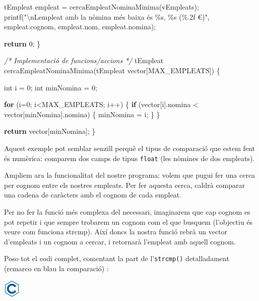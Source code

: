 \documentclass[]{book}
\newenvironment{Shaded}{\begin{snugshade}}{\end{snugshade}}
\newcommand{\CommentTok}[1]{\textcolor[rgb]{0.56,0.35,0.01}{\textit{#1}}}
\newcommand{\ControlFlowTok}[1]{\textcolor[rgb]{0.13,0.29,0.53}{\textbf{#1}}}
\newcommand{\DataTypeTok}[1]{\textcolor[rgb]{0.13,0.29,0.53}{#1}}
\newcommand{\DecValTok}[1]{\textcolor[rgb]{0.00,0.00,0.81}{#1}}
\newcommand{\NormalTok}[1]{#1}
\newcommand{\SpecialCharTok}[1]{\textcolor[rgb]{0.00,0.00,0.00}{#1}}
\newcommand{\StringTok}[1]{\textcolor[rgb]{0.31,0.60,0.02}{#1}}
\begin{document}
\begin{Shaded}
\begin{Highlighting}[]
\NormalTok{    tEmpleat empleat = cercaEmpleatNominaMinima(vEmpleats);}
\NormalTok{    printf(}\StringTok{"}\SpecialCharTok{\textbackslash{}n}\StringTok{L\textquotesingle{}empleat amb la nòmina més baixa és \%s, \%s (\%.2f €)"}\NormalTok{, empleat.cognom, empleat.nom, empleat.nomina);}

    \ControlFlowTok{return} \DecValTok{0}\NormalTok{;}
\NormalTok{\}}

\CommentTok{/* Implementació de funcions/accions */}
\NormalTok{tEmpleat cercaEmpleatNominaMinima(tEmpleat vector[MAX\_EMPLEATS]) \{}

    \DataTypeTok{int}\NormalTok{ i = }\DecValTok{0}\NormalTok{; }
    \DataTypeTok{int}\NormalTok{ minNomina = }\DecValTok{0}\NormalTok{;}

    \ControlFlowTok{for}\NormalTok{ (i=}\DecValTok{0}\NormalTok{; i\textless{}MAX\_EMPLEATS; i++) \{}
        \ControlFlowTok{if}\NormalTok{ (vector[i].nomina \textless{} vector[minNomina].nomina) \{}
\NormalTok{            minNomina = i;}
\NormalTok{        \}}
\NormalTok{    \}}

    \ControlFlowTok{return}\NormalTok{ vector[minNomina];}
\NormalTok{\}}
\end{Highlighting}
\end{Shaded}

Aquest exemple pot semblar senzill perquè el tipus de comparació que estem fent és numèrica: comparem dos camps de tipus \texttt{float} (les nòmines de dos empleats).

Ampliem ara la funcionalitat del nostre programa: volem que pugui fer una cerca per cognom entre els nostres empleats. Per fer aquesta cerca, caldrà comparar una cadena de caràcters amb el cognom de cada empleat.

Per no fer la funció més complexa del necessari, imaginarem que cap cognom es pot repetir i que sempre trobarem un cognom com el que busquem (l'objectiu és veure com funciona strcmp). Així doncs la nostra funció rebrà un vector d'empleats i un cognom a cercar, i retornarà l'empleat amb aquell cognom.

Poso tot el codi complet, comentant la part de l'\texttt{strcmp()} detalladament (remarco en blau la comparació) :

\includegraphics{./img/c.png}
\end{document}
